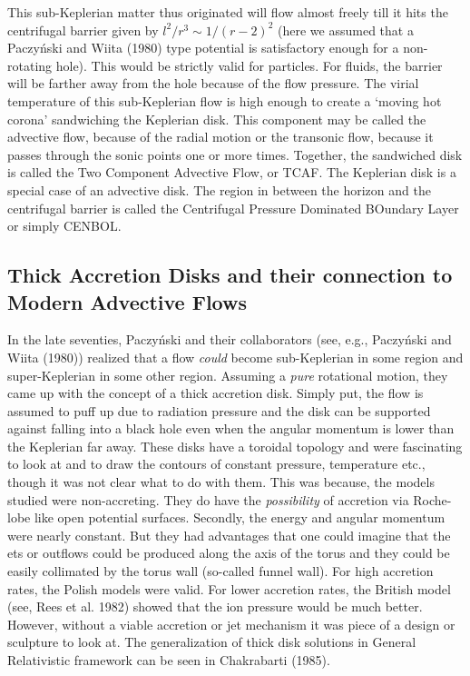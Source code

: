 \documentclass{ws-procs975x65}
\begin{document}
This sub-Keplerian matter thus originated will flow almost freely till it hits the
centrifugal barrier given by $l^2/r^3 \sim 1/(r-2)^2$ (here we assumed that a Paczy\'nski and Wiita (1980) type
potential is satisfactory enough for a non-rotating hole). This would be strictly valid for 
particles. For fluids, the barrier will be farther away from the hole because of the flow pressure. 
The virial temperature of this sub-Keplerian flow is high enough to create a `moving hot corona' 
sandwiching the Keplerian disk. This component may be called the advective flow, because of the radial
motion or the transonic flow, because it passes through the sonic points one or more times. Together,
the sandwiched disk is called the Two Component Advective Flow, or TCAF. The Keplerian disk is a
special case of an advective disk. The region in between the horizon and the centrifugal barrier 
is called the Centrifugal Pressure Dominated BOundary Layer or simply CENBOL. 

\subsection{Thick Accretion Disks and their connection to Modern Advective Flows}

In the late seventies, Paczy\'nski and their collaborators (see, e.g., Paczy\'nski and Wiita (1980)) 
realized that a flow {\it could} become sub-Keplerian in some region and super-Keplerian in some 
other region. Assuming a {\it pure} rotational motion, they came up with the concept of a thick accretion 
disk. Simply put, the flow is assumed to puff up due to radiation pressure and the disk can be supported 
against falling into a black hole even when the angular momentum is lower than the Keplerian far away.
These disks have a toroidal topology and were fascinating to look at and to draw the contours of 
constant pressure, temperature etc., though it was not clear what to do with them. This was because,
the models studied were non-accreting. They  do have the {\it possibility} of accretion via 
Roche-lobe like open potential surfaces. Secondly, the energy and angular momentum were 
nearly constant. But they had advantages that one could imagine that the ets or outflows
could be produced along the axis of the torus and they could be easily collimated by the torus wall
(so-called funnel wall). For high accretion rates, the Polish models were valid. For lower accretion 
rates, the British model (see, Rees et al. 1982) showed that the ion pressure would be 
much better. However, without a viable accretion or jet mechanism it was piece of a design or sculpture 
to look at. The generalization of thick disk solutions in General Relativistic framework can be seen 
in Chakrabarti (1985).
\end{document}
